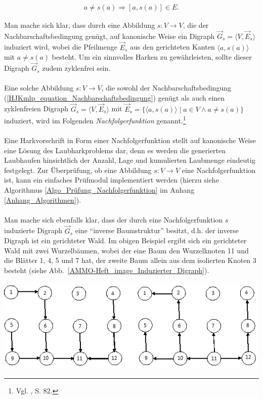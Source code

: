 \documentclass[fontsize=12pt,doubleside,openany,listof=totoc,listof=flat,listof=nochaptergap,numbers=noenddot]{scrbook}
\theoremstyle{style}
\begin{document}
\begin{align}
a \neq s(a) \Rightarrow [a,s(a)] \in E.\label{HJKmlp_equation_Nachbarschaftsbedingung}
\end{align}

\noindent Man mache sich klar, dass durch eine Abbildung $s:V \rightarrow V$, die der Nachbarschaftsbedingung genügt, auf kanonische Weise ein Digraph $\vec{G}_s = \langle V,\vec{E}_s \rangle$ induziert wird, wobei die Pfeilmenge $\vec{E}_s$ aus den gerichteten Kanten $\langle a,s(a) \rangle$ mit $a \neq s(a)$ besteht. Um ein sinnvolles Harken zu gewährleisten, sollte dieser Digraph $\vec{G}_s$ zudem zyklenfrei sein. \\
\\
Eine solche Abbildung $s:V \rightarrow V$, die sowohl der Nachbarschaftsbedingung (\ref{HJKmlp_equation_Nachbarschaftsbedingung}) genügt als auch einen zyklenfreien Digraph $\vec{G}_s = \langle V,\vec{E}_s \rangle$ mit $\vec{E}_s = \{\langle a,s(a)\rangle \mid a\in V \wedge a \neq s(a)\}$\label{induzierter Teilgraph} induziert, wird im Folgenden \textit{Nachfolgerfunktion}\label{Nachfolgerfunktion} genannt.\footnote{Vgl. \cite{kruse}, S. 82.} \\
\\
Eine Harkvorschrift in Form einer Nachfolgerfunktion stellt auf kanonische Weise eine Lösung des Laubharkproblems dar, denn es werden die generierten Laubhaufen hinsichtlich der Anzahl, Lage und kumulierten Laubmenge eindeutig festgelegt. Zur Überprüfung, ob eine Abbildung $s:V \rightarrow V$ eine Nachfolgerfunktion ist, kann ein einfaches Prüfmodul implementiert werden (hierzu siehe Algorithmus \ref{Algo_Prüfung_Nachfolgerfunktion} im Anhang \ref{Anhang_Algorithmen}). \\ 
\\
Man mache sich ebenfalls klar, dass der durch eine Nachfolgerfunktion $s$ induzierte Digraph $\vec{G}_s$  eine "`inverse Baumstruktur"' besitzt, d.h. der inverse Digraph ist ein gerichteter Wald. Im obigen Beispiel ergibt sich ein gerichteter Wald mit zwei Wurzelbäumen, wobei der eine Baum den Wurzelknoten 11 und die Blätter 1, 4, 5 und 7 hat, der zweite Baum allein aus dem isolierten Knoten 3 besteht (siehe Abb.~\ref{AMMO-Heft_image_Induzierter_Digraph}).

\begin{center}
\begin{minipage}{\textwidth}
\centerline{\includegraphics[angle=0,scale=1.4]{Figures/Laub/Induzierter_Digraph.png}}
\label{AMMO-Heft_image_Induzierter_Digraph}
\end{minipage}
\end{center}
\end{document}
